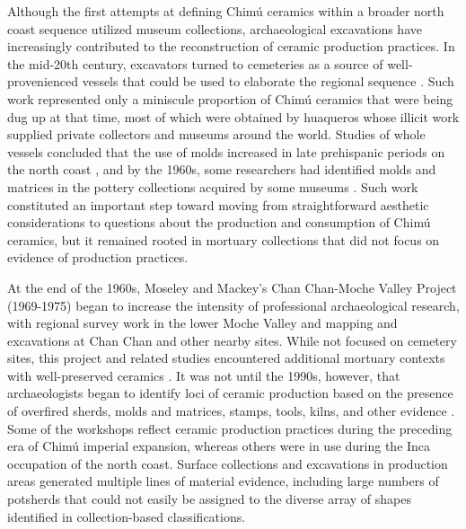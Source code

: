 \documentclass[]{interact}
\theoremstyle{plain}%
\theoremstyle{definition}
\theoremstyle{remark}
\begin{document}
Although the first attempts at defining Chimú ceramics within a broader
north coast sequence utilized museum collections, archaeological
excavations have increasingly contributed to the reconstruction of
ceramic production practices. In the mid-20th century, excavators turned
to cemeteries as a source of well-provenienced vessels that could be
used to elaborate the regional sequence \citep{RN8727,RN11161}. Such
work represented only a miniscule proportion of Chimú ceramics that were
being dug up at that time, most of which were obtained by huaqueros
whose illicit work supplied private collectors and museums around the
world. Studies of whole vessels concluded that the use of molds
increased in late prehispanic periods on the north coast \citep{RN8727},
and by the 1960s, some researchers had identified molds and matrices in
the pottery collections acquired by some museums
\citep{RN11162,RN11163}. Such work constituted an important step toward
moving from straightforward aesthetic considerations to questions about
the production and consumption of Chimú ceramics, but it remained rooted
in mortuary collections that did not focus on evidence of production
practices.

At the end of the 1960s, Moseley and Mackey's Chan Chan-Moche Valley
Project (1969-1975) began to increase the intensity of professional
archaeological research, with regional survey work in the lower Moche
Valley and mapping and excavations at Chan Chan and other nearby sites.
While not focused on cemetery sites, this project and related studies
encountered additional mortuary contexts with well-preserved ceramics
\citep{RN11165}. It was not until the 1990s, however, that
archaeologists began to identify loci of ceramic production based on the
presence of overfired sherds, molds and matrices, stamps, tools, kilns,
and other evidence
\citep{RN11164,RN8875,RN11166,RN11167,RN11168,RN11169}. Some of the
workshops reflect ceramic production practices during the preceding era
of Chimú imperial expansion, whereas others were in use during the Inca
occupation of the north coast. Surface collections and excavations in
production areas generated multiple lines of material evidence,
including large numbers of potsherds that could not easily be assigned
to the diverse array of shapes identified in collection-based
classifications.
\end{document}
